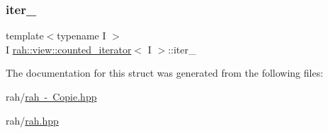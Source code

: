 \mbox{\label{structrah_1_1view_1_1counted__iterator_a907dba6ac64293e4c5718e522da4972e}} 
\subsubsection{\texorpdfstring{iter\_}{iter\_}}
{\footnotesize\ttfamily template$<$typename I $>$ \\
I \mbox{\hyperlink{structrah_1_1view_1_1counted__iterator}{rah\+::view\+::counted\+\_\+iterator}}$<$ I $>$\+::iter\+\_\+}



The documentation for this struct was generated from the following files\+:\begin{DoxyCompactItemize}
\item 
rah/\mbox{\hyperlink{rah_01-_01_copie_8hpp}{rah -\/ Copie.\+hpp}}\item 
rah/\mbox{\hyperlink{rah_8hpp}{rah.\+hpp}}\end{DoxyCompactItemize}

